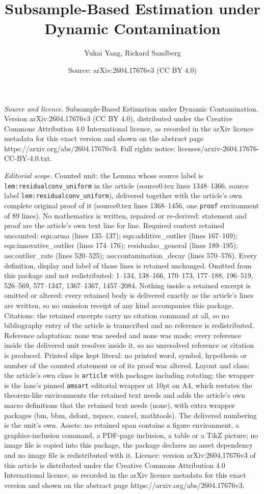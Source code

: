 \documentclass[10pt,a4paper]{amsart}
\title[Subsample-Based Estimation under Dynamic Contamination]{Subsample-Based Estimation under Dynamic Contamination}
\author{Yukai Yang, Rickard Sandberg}
\date{Source: arXiv:2604.17676v3 (CC BY 4.0)}
\begin{document}
\maketitle

\noindent\emph{Source and licence.} Subsample-Based Estimation under Dynamic Contamination. Version arXiv:2604.17676v3 (CC BY 4.0), distributed under the Creative Commons Attribution 4.0 International licence, as recorded in the arXiv licence metadata for this exact version and shown on the abstract page https://arxiv.org/abs/2604.17676v3. Full rights notice: licenses/arxiv-2604.17676-CC-BY-4.0.txt.\par\smallskip

\noindent\textit{Editorial scope.} Counted unit: the Lemma whose source label is \texttt{lem:residualconv\_uniform} in the article (source0.tex lines 1348--1366, source label \texttt{lem:residualconv\_uniform}), delivered together with the article's own complete original proof of it (source0.tex lines 1368--1456, one \texttt{proof} environment of 89 lines). No mathematics is written, repaired or re-derived: statement and proof are the article's own text line for line. Required context retained uncounted: eqn:arma (lines 135--137); eqn:additive\_outlier (lines 167--169); eqn:innovative\_outlier (lines 174--176); residualao\_general (lines 189--195); ass:outlier\_rate (lines 520--525); ass:contamination\_decay (lines 570--576). Every definition, display and label of those lines is retained unchanged. Omitted from this package and not redistributed: 1--134, 138--166, 170--173, 177--188, 196--519, 526--569, 577--1347, 1367--1367, 1457--2084. Nothing inside a retained excerpt is omitted or altered: every retained body is delivered exactly as the article's lines are written, so no omission receipt of any kind accompanies this package. Citations: the retained excerpts carry no citation command at all, so no bibliography entry of the article is transcribed and no reference is redistributed. Reference adaptation: none was needed and none was made; every reference inside the delivered unit resolves inside it, so no unresolved reference or citation is produced. Printed slips kept literal: no printed word, symbol, hypothesis or number of the counted statement or of its proof was altered. Layout and class: the article's own class is \texttt{article} with packages including rotating; the wrapper is the lane's pinned \texttt{amsart} editorial wrapper at 10pt on A4, which restates the theorem-like environments the retained text needs and adds the article's own macro definitions that the retained text needs (none), with extra wrapper packages (bm, bbm, dsfont, xspace, cancel, mathtools). The delivered numbering is the unit's own. Assets: no retained span contains a figure environment, a graphics-inclusion command, a PDF-page inclusion, a table or a TikZ picture; no image file is copied into this package, the package declares no asset dependency and no image file is redistributed with it. Licence: version arXiv:2604.17676v3 of this article is distributed under the Creative Commons Attribution 4.0 International licence, as recorded in the arXiv licence metadata for this exact version and shown on the abstract page https://arxiv.org/abs/2604.17676v3. 
\end{document}
